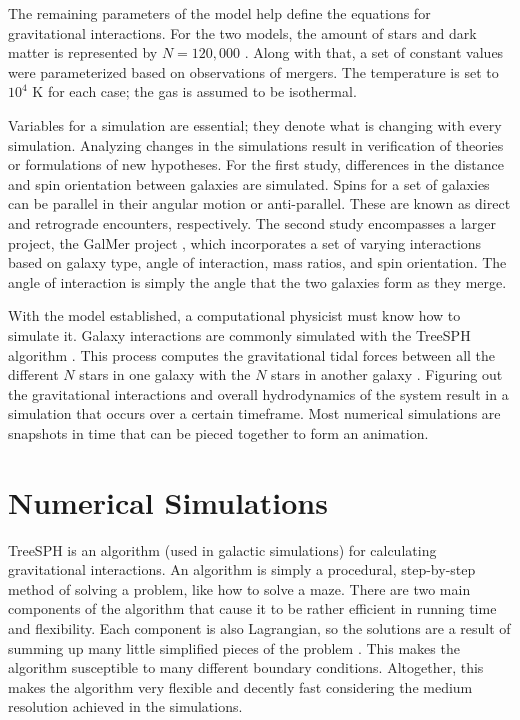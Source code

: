\documentclass[11pt]{article} %
\begin{document}
	The remaining parameters of the model help define the equations for gravitational interactions. For the two models, the amount of stars and dark matter is represented by $N = 120,000$ \cite{mergers,mergerstats}. Along with that, a set of constant values were parameterized based on observations of mergers. The temperature is set to $10^4$ K for each case; the gas is assumed to be isothermal.

	Variables for a simulation are essential; they denote what is changing with every simulation. Analyzing changes in the simulations result in verification of theories or formulations of new hypotheses. For the first study, differences in the distance and spin orientation between galaxies are simulated. Spins for a set of galaxies can be parallel in their angular motion or anti-parallel. These are known as direct and retrograde encounters, respectively. The second study encompasses a larger project, the GalMer project \cite{GalMer}, which incorporates a set of varying interactions based on galaxy type, angle of interaction, mass ratios, and spin orientation. The angle of interaction is simply the angle that the two galaxies form as they merge.

	With the model established, a computational physicist must know how to simulate it. Galaxy interactions are commonly simulated with the TreeSPH algorithm \cite{mergers,mergerstats,treesph,algorithm,LBG}. This process computes the gravitational tidal forces between all the different $N$ stars in one galaxy with the $N$ stars in another galaxy \cite{LBG}. Figuring out the gravitational interactions and overall hydrodynamics of the system result in a simulation that occurs over a certain timeframe. Most numerical simulations are snapshots in time that can be pieced together to form an animation.


\section{Numerical Simulations}
	TreeSPH is an algorithm (used in galactic simulations) for calculating gravitational interactions. An algorithm is simply a procedural, step-by-step method of solving a problem, like how to solve a maze. There are two main components of the algorithm that cause it to be rather efficient in running time and flexibility. Each component is also Lagrangian, so the solutions are a result of summing up many little simplified pieces of the problem \cite{treesph}. This makes the algorithm susceptible to many different boundary conditions. Altogether, this makes the algorithm very flexible and decently fast considering the medium resolution achieved in the simulations.
\end{document}
